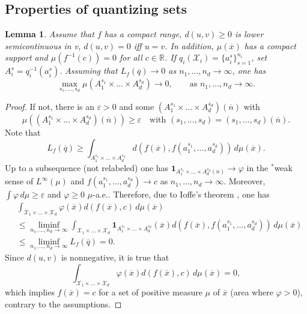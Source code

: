 \documentclass{amsart}
\newtheorem{lemma}[theorem]{Lemma}
\theoremstyle{remark}
\numberwithin{equation}{section}
\numberwithin{figure}{section}
\newcommand{\R}{\mathbb{R}}
\def\eps{\varepsilon}
\def\mX{\mathcal{X}}
\def\v{\overline}
\begin{document}
	\subsection{Properties of quantizing sets}

\begin{lemma}
	\label{lem:quant_zero_measure}
	Assume that $f$ has a compact range, $d(u, v)\geq 0$ is lower semicontinuous in v, $d(u, v) = 0$ iff $u = v$. In addition, $\mu(\v x)$ has a compact support and $\mu(f^{-1} (c))=0$ for all $c \in \R$. If $q_i(\mX_i) = \{a_i^{s}\}_{s=1}^{n_i}$, set $A_i^s = q_i^{-1}(a_i^s).$
	Assuming that $L_f(\v q) \to 0$ as $n_1, \ldots, n_d \to \infty$, one has 
	\[
	\max_{s_1, \ldots, s_d} \mu (A_1^{s_1}\times \ldots \times A_d^{s_d}) \to 0, \qquad \mbox{as } n_1, \ldots, n_d \to\infty.
	\]
\end{lemma}
\begin{proof}
	If not, there is an $\varepsilon>0$ and some $	(A_1^{s_1}\times \ldots \times A_d^{s_d})(\v n)$ with 
	\[
\mu((A_1^{s_1} \times\ldots \times A_d^{s_d})(\v n)) \geq \varepsilon \quad \mbox{with $(s_1, \ldots, s_d) = (s_1, \ldots, s_d) (\v n)$}.
	\]
	Note that
	\[
	L_f(\v q) \geq \int_{A_1^{s_1} \times\ldots \times A_d^{s_d}} d(f(\v x), f( a_1^{s_1},\ldots, a_d^{s_d}))\, d\mu(\v x).
	\]
	Up to a subsequence (not relabeled) one has $\mathbf{1}_{A_1^{s_1}\times\ldots\times A_d^{s_d} (\v n)} \to \varphi$ in the $^*$weak sense of $L^\infty(\mu)$ and  $f(a_1^{s_1},\ldots,  a_d^{s_d}) \to c$ as $n_1, \ldots, n_d \to \infty$. Moreover, $\int \varphi \, d\mu \geq \eps$ and $\varphi \geq 0$ $\mu$-a.e.. Therefore, due to Ioffe's theorem \cite{Ioffe}, one has 
	\begin{align*}
	& \int_{\mX_1 \times \ldots \times \mX_d} \varphi(\v x) d(f(\v x), c)\, d\mu(\v x) \\
	&\leq \liminf_{n_1, \ldots, n_d \to \infty} \int_{\mX_1\times \ldots \times \mX_d}\mathbf{1}_{A_1^{s_1}\times \ldots \times A_d^{s_d}}(\v x) d( f(\v x), f( a_1^{s_1}, \ldots, a_d^{s_d}))\, d\mu(\v x)
	\\ &\leq \liminf_{n_1, \ldots, n_d \to \infty} L_f(\v q) = 0.
	\end{align*}
	Since $d(u, v)$ is nonnegative, it is true that
	\[
	\int_{\mX_1 \times \ldots \times \mX_d} \varphi(\v x) d(f(\v x), c)\, d\mu(\v x)=0,
	\]
	which implies
	$f(\v x)=c$ for a set of positive measure $\mu$ of $\v x$ (area where $\varphi > 0$), contrary to the assumptions.
\end{proof}
\end{document}
